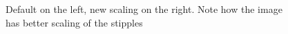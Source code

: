\documentclass[11pt]{article}
\begin{document}
\begin{figure}[H]
  \centering
  \begin{minipage}{.5\textwidth}
    \centering
    
  \end{minipage}%
  \begin{minipage}{.5\textwidth}
    \centering
    
  \end{minipage}
  \caption{Default on the left, new scaling on the right. Note how the
    image has better scaling of the stipples}
\end{figure}





\end{document}
